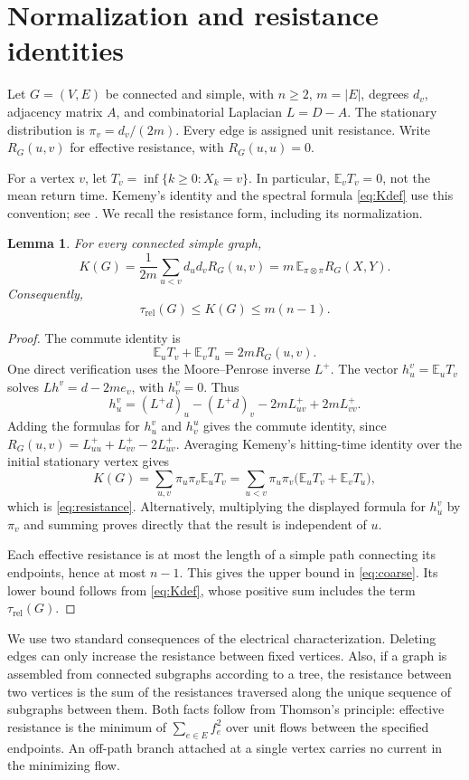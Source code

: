 \documentclass[11pt]{amsart}
\numberwithin{equation}{section}
\newtheorem{lemma}[theorem]{Lemma}
\theoremstyle{definition}
\theoremstyle{remark}
\newcommand{\E}{\mathbb E}
\newcommand{\trel}{\tau_{\mathrm{rel}}}
\begin{document}
\section{Normalization and resistance identities}\label{sec:prelim}
Let $G=(V,E)$ be connected and simple, with $n\ge2$, $m=|E|$, degrees $d_v$, adjacency matrix $A$, and combinatorial Laplacian $L=D-A$. The stationary distribution is $\pi_v=d_v/(2m)$. Every edge is assigned unit resistance. Write $R_G(u,v)$ for effective resistance, with $R_G(u,u)=0$.

For a vertex $v$, let $T_v=\inf\{k\ge0:X_k=v\}$. In particular, $\E_vT_v=0$, not the mean return time. Kemeny's identity and the spectral formula \eqref{eq:Kdef} use this convention; see \cite{AF}. We recall the resistance form, including its normalization.

\begin{lemma}\label{lem:resistance}
For every connected simple graph,
\begin{equation}\label{eq:resistance}
K(G)=\frac1{2m}\sum_{u<v}d_ud_vR_G(u,v)
=m\,\E_{\pi\otimes\pi}R_G(X,Y).
\end{equation}
Consequently,
\begin{equation}\label{eq:coarse}
\trel(G)\le K(G)\le m(n-1).
\end{equation}
\end{lemma}
\begin{proof}
The commute identity is
\[
\E_uT_v+\E_vT_u=2mR_G(u,v).
\]
One direct verification uses the Moore--Penrose inverse $L^+$. The vector $h^v_u=\E_uT_v$ solves $Lh^v=d-2me_v$, with $h^v_v=0$. Thus
\[
h^v_u=(L^+d)_u-(L^+d)_v-2mL^+_{uv}+2mL^+_{vv}.
\]
Adding the formulas for $h^v_u$ and $h^u_v$ gives the commute identity, since $R_G(u,v)=L^+_{uu}+L^+_{vv}-2L^+_{uv}$. Averaging Kemeny's hitting-time identity over the initial stationary vertex gives
\[
K(G)=\sum_{u,v}\pi_u\pi_v\E_uT_v
=\sum_{u<v}\pi_u\pi_v\bigl(\E_uT_v+\E_vT_u\bigr),
\]
which is \eqref{eq:resistance}. Alternatively, multiplying the displayed formula for $h^v_u$ by $\pi_v$ and summing proves directly that the result is independent of $u$.

Each effective resistance is at most the length of a simple path connecting its endpoints, hence at most $n-1$. This gives the upper bound in \eqref{eq:coarse}. Its lower bound follows from \eqref{eq:Kdef}, whose positive sum includes the term $\trel(G)$.
\end{proof}

We use two standard consequences of the electrical characterization. Deleting edges can only increase the resistance between fixed vertices. Also, if a graph is assembled from connected subgraphs according to a tree, the resistance between two vertices is the sum of the resistances traversed along the unique sequence of subgraphs between them. Both facts follow from Thomson's principle: effective resistance is the minimum of $\sum_{e\in E}f_e^2$ over unit flows between the specified endpoints. An off-path branch attached at a single vertex carries no current in the minimizing flow.
\end{document}
